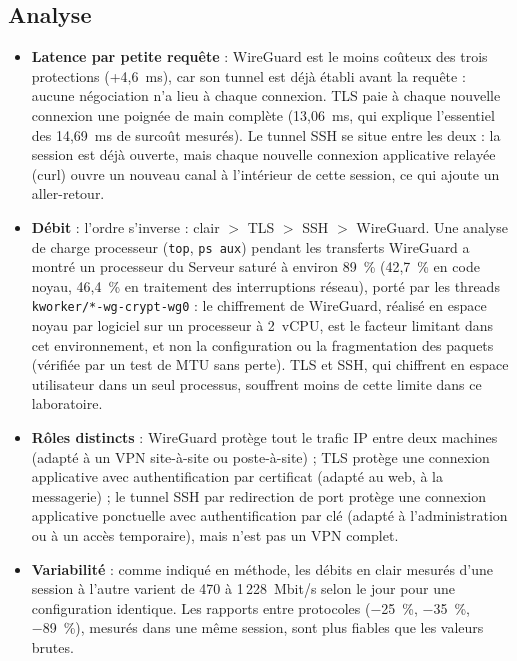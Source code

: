 \documentclass[11pt,a4paper]{article}
\begin{document}
\subsection{Analyse}
\begin{itemize}
  \item \textbf{Latence par petite requête} : WireGuard est le moins coûteux des trois protections
        (+4,6~ms), car son tunnel est déjà établi avant la requête : aucune négociation n'a lieu
        à chaque connexion. TLS paie à chaque nouvelle connexion une poignée de main complète
        (13,06~ms, qui explique l'essentiel des 14,69~ms de surcoût mesurés). Le tunnel SSH se
        situe entre les deux : la session est déjà ouverte, mais chaque nouvelle connexion
        applicative relayée (curl) ouvre un nouveau canal à l'intérieur de cette session, ce qui
        ajoute un aller-retour.
  \item \textbf{Débit} : l'ordre s'inverse : clair $>$ TLS $>$ SSH $>$ WireGuard. Une analyse de
        charge processeur (\texttt{top}, \texttt{ps aux}) pendant les transferts WireGuard a montré
        un processeur du Serveur saturé à environ 89~\% (42,7~\% en code noyau, 46,4~\% en
        traitement des interruptions réseau), porté par les threads \texttt{kworker/*-wg-crypt-wg0} :
        le chiffrement de WireGuard, réalisé en espace noyau par logiciel sur un processeur à
        2~vCPU, est le facteur limitant dans cet environnement, et non la configuration ou la
        fragmentation des paquets (vérifiée par un test de MTU sans perte). TLS et SSH, qui
        chiffrent en espace utilisateur dans un seul processus, souffrent moins de cette limite
        dans ce laboratoire.
  \item \textbf{Rôles distincts} : WireGuard protège tout le trafic IP entre deux machines (adapté
        à un VPN site-à-site ou poste-à-site) ; TLS protège une connexion applicative avec
        authentification par certificat (adapté au web, à la messagerie) ; le tunnel SSH par
        redirection de port protège une connexion applicative ponctuelle avec authentification par
        clé (adapté à l'administration ou à un accès temporaire), mais n'est pas un VPN complet.
  \item \textbf{Variabilité} : comme indiqué en méthode, les débits en clair mesurés d'une session
        à l'autre varient de 470 à 1\,228~Mbit/s selon le jour pour une configuration identique.
        Les rapports entre protocoles (−25~\%, −35~\%, −89~\%), mesurés dans une même session,
        sont plus fiables que les valeurs brutes.
\end{itemize}
\end{document}
